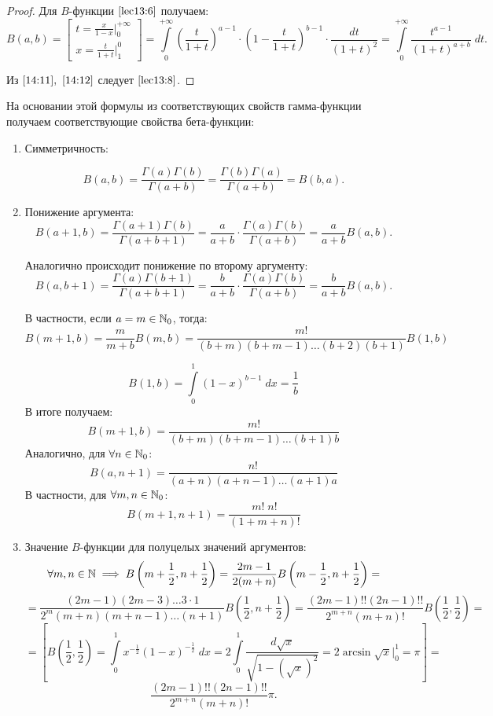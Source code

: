 \documentclass[../../main.tex]{subfiles}
\begin{document}
\begin{proof}
Для $B$-функции $\eqref{lec13:6}$ получаем: 
\begin{equation}
\label{14:12}
   B(a,b) = \left[  \begin{gathered}
t = \frac{x}{1-x} \Big|_{0}^{+\infty}\\
x = \frac{t}{1+t}  \Big|_{1}^{0} 
\end{gathered}   \right]   = \int\limits_{0}^{+\infty} \left(  \frac{t}{1+t} 
\right)^{a-1} \cdot \left(1 - \frac{t}{1+t} \right)^{b-1} \cdot 
\frac{dt}{\left( 1+t 
\right)^2} = \int\limits_{0}^{+\infty} \frac{t^{a-1}}{\left( 1+t 
\right)^{a+b}} \; dt.
\end{equation}

Из  $\eqref{14:11},\ \eqref{14:12}$ следует $\eqref{lec13:8}$.
\end{proof}

На основании 
этой формулы из соответствующих свойств гамма-функции получаем соответствующие 
свойства бета-функции:

\begin{enumerate}
	\item Симметричность: 
	
	\[  B(a,b) = \frac{\Gamma(a) \Gamma(b)}{\Gamma(a+b)} = \frac{\Gamma(b)  
	\Gamma(a) }{\Gamma(a+b)} = B(b,a).   \]
	
	\item Понижение аргумента:
	\[   B(a+1,b) = \frac{\Gamma(a+1) \Gamma(b)}{\Gamma(a+b+1)}  = \frac{a}{a+b} 
	\cdot \frac{\Gamma(a) \Gamma(b)}{\Gamma(a+b)}  = \frac{a}{a+b}  B(a,b). \]
	
	Аналогично происходит понижение по второму аргументу:
	\[  B(a,b+1) =  \frac{\Gamma(a) \Gamma(b+1)}{\Gamma(a+b+1)}  = \frac{b}{a+b} 
	\cdot \frac{\Gamma(a) \Gamma(b)}{\Gamma(a+b)}  = \frac{b}{a+b}  B(a,b). \]
	
	В частности, если $a=m \in \mathbb{N}_0$, тогда:
	\[  B(m+1,b) = \frac{m}{m+b} B(m,b) = \frac{m!}{(b+m)(b+m-1)\dots(b+2)(b+1)} 
	B(1,b)  \]
	
	\[ B(1,b) = \int\limits_{0}^{1} \left( 1-x \right) ^{b-1} \; dx = \frac{1}{b} 
	\]
	В итоге получаем:
	\[  B(m+1,b) = \frac{m!}{(b+m)(b+m-1)\dots(b+1)b}     \]
	Аналогично, для $\forall n \in \mathbb{N}_0$:
	\[  B(a,n+1) = \frac{n!}{(a+n)(a+n-1)\dots(a+1)a}  \]
	В частности, для $\forall m,n \in \mathbb{N}_0$:
	\[  B(m+1,n+1) = \frac{m! \; n!}{(1+m+n)!}   \]
	
	\item Значение $B$-функции для полуцелых значений аргументов:
	\[  \forall m,n \in \mathbb{N} \implies B\left( m+\frac{1}{2}, n+\frac{1}{2} \right) 
	= \frac{2m - 1}{2(m+n)} 
	B\left( m-\frac{1}{2}, n+\frac{1}{2} \right) = \]
	\[ = \frac{(2m-1)(2m-3) \dots 3 \cdot 1}{2^m (m+n)(m+n-1)\dots (n+1)} B\left( 
	\frac{1}{2}, n+\frac{1}{2} \right) = \frac{(2m-1)!! (2n-1)!! }{2^{m+n} 
	(m+n)!} B\left( \frac{1}{2}, \frac{1}{2} \right) =  \]
	\[ = \left[  B\left( \frac{1}{2}, \frac{1}{2} \right) = \int\limits_{0}^{1} 
	x^{-\frac{1}{2}} \left( 1-x \right)^{-\frac{1}{2}} \; dx = 2 
	\int\limits_{0}^{1} \frac{d \sqrt{x} }{\sqrt{1 - \left(\sqrt{x} \right)^2 }} 
	= 2 \arcsin{\sqrt{x}} \Big|_{0}^{1} = \pi  \right] =     \]
	\[   \frac{(2m-1)!! (2n-1)!! }{2^{m+n} (m+n)!} \pi. \]
\end{enumerate}
\end{document}
